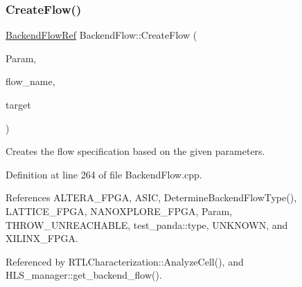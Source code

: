 \subsubsection{\texorpdfstring{Create\+Flow()}{CreateFlow()}}
{\footnotesize\ttfamily \hyperlink{BackendFlow_8hpp_addb01ef393ed4ea8a79765c8ebfcf5a0}{Backend\+Flow\+Ref} Backend\+Flow\+::\+Create\+Flow (\begin{DoxyParamCaption}\item[{const \hyperlink{Parameter_8hpp_a37841774a6fcb479b597fdf8955eb4ea}{Parameter\+Const\+Ref}}]{Param,  }\item[{const std\+::string \&}]{flow\+\_\+name,  }\item[{const \hyperlink{target__manager_8hpp_aee0b586a84fb6eb4faefa6e41e1735a9}{target\+\_\+manager\+Ref}}]{target }\end{DoxyParamCaption})\hspace{0.3cm}{\ttfamily [static]}}



Creates the flow specification based on the given parameters. 



Definition at line 264 of file Backend\+Flow.\+cpp.



References A\+L\+T\+E\+R\+A\+\_\+\+F\+P\+GA, A\+S\+IC, Determine\+Backend\+Flow\+Type(), L\+A\+T\+T\+I\+C\+E\+\_\+\+F\+P\+GA, N\+A\+N\+O\+X\+P\+L\+O\+R\+E\+\_\+\+F\+P\+GA, Param, T\+H\+R\+O\+W\+\_\+\+U\+N\+R\+E\+A\+C\+H\+A\+B\+LE, test\+\_\+panda\+::type, U\+N\+K\+N\+O\+WN, and X\+I\+L\+I\+N\+X\+\_\+\+F\+P\+GA.



Referenced by R\+T\+L\+Characterization\+::\+Analyze\+Cell(), and H\+L\+S\+\_\+manager\+::get\+\_\+backend\+\_\+flow().

